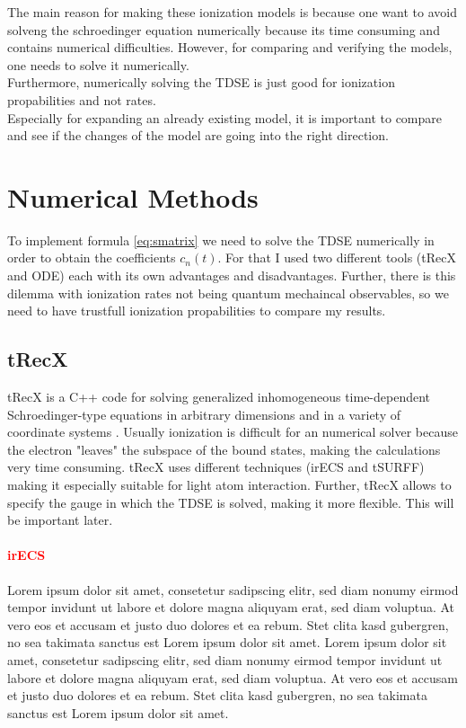 The main reason for making these ionization models is because one want to avoid solveng the schroedinger equation numerically because its time consuming and contains numerical difficulties.
However, for comparing and verifying the models, one needs to solve it numerically.\\
Furthermore, numerically solving the TDSE is just good for ionization propabilities and not rates.\\
Especially for expanding an already existing model, it is important to compare and see if the changes of the model are going into the right direction.



\section{Numerical Methods}
To implement formula \ref{eq:smatrix} we need to solve the TDSE numerically in order to obtain the coefficients $c_n(t)$. 
For that I used two different tools (tRecX and ODE) each with its own advantages and disadvantages.
Further, there is this dilemma with ionization rates not being quantum mechaincal observables, so we need to have trustfull ionization propabilities to compare my results.



\subsection{tRecX}
tRecX is a C++ code for solving generalized inhomogeneous time-dependent
Schroedinger-type equations in arbitrary dimensions and in a variety of coordinate systems \cite{Scrinzi_trecx}.
Usually ionization is difficult for an numerical solver because the electron "leaves" the subspace of the bound states, making the calculations very time consuming.
tRecX uses different techniques (irECS and tSURFF) making it especially suitable for light atom interaction. 
Further, tRecX allows to specify the gauge in which the TDSE is solved, making it more flexible. 
This will be important later.

\paragraph{\textcolor{red}{irECS}}
Lorem ipsum dolor sit amet, consetetur sadipscing elitr, sed diam nonumy eirmod tempor invidunt ut labore et dolore magna aliquyam erat, sed diam voluptua. At vero eos et accusam et justo duo dolores et ea rebum. Stet clita kasd gubergren, no sea takimata sanctus est Lorem ipsum dolor sit amet. Lorem ipsum dolor sit amet, consetetur sadipscing elitr, sed diam nonumy eirmod tempor invidunt ut labore et dolore magna aliquyam erat, sed diam voluptua. At vero eos et accusam et justo duo dolores et ea rebum. Stet clita kasd gubergren, no sea takimata sanctus est Lorem ipsum dolor sit amet.
